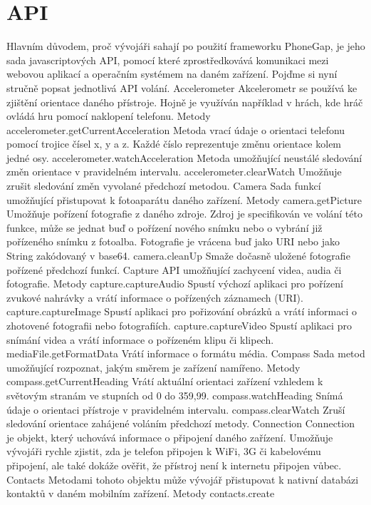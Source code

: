 \section{API}
Hlavním důvodem, proč vývojáři sahají po použití frameworku PhoneGap, je jeho sada javascriptových API, pomocí které zprostředkovává komunikaci mezi webovou aplikací a operačním systémem na daném zařízení. Pojďme si nyní stručně popsat jednotlivá API volání.
Accelerometer
Akcelerometr se používá ke zjištění orientace daného přístroje. Hojně je využíván například v hrách, kde hráč ovládá hru pomocí naklopení telefonu.
Metody
accelerometer.getCurrentAcceleration
Metoda vrací údaje o orientaci telefonu pomocí trojice čísel x, y a z. Každé číslo reprezentuje změnu orientace kolem jedné osy.
accelerometer.watchAcceleration
Metoda umožňující neustálé sledování změn orientace v pravidelném intervalu.
accelerometer.clearWatch
Umožňuje zrušit sledování změn vyvolané předchozí metodou.
Camera
Sada funkcí umožňující přistupovat k fotoaparátu daného zařízení.
Metody
camera.getPicture
Umožňuje pořízení fotografie z daného zdroje. Zdroj je specifikován ve volání této funkce, může se jednat buď o pořízení nového snímku nebo o vybrání již pořízeného snímku z fotoalba. Fotografie je vrácena buď jako URI nebo jako String zakódovaný v base64.
camera.cleanUp
Smaže dočasně uložené fotografie pořízené předchozí funkcí.
Capture
API umožňující zachycení videa, audia či fotografie.
Metody
capture.captureAudio
Spustí výchozí aplikaci pro pořízení zvukové nahrávky a vrátí informace o pořízených záznamech (URI).
capture.captureImage
Spustí aplikaci pro pořizování obrázků a vrátí informaci o zhotovené fotografii nebo fotografiích.
capture.captureVideo
Spustí aplikaci pro snímání videa a vrátí informace o pořízeném klipu či klipech.
mediaFile.getFormatData
Vrátí informace o formátu média.
Compass
Sada metod umožňující rozpoznat, jakým směrem je zařízení namířeno.
Metody
compass.getCurrentHeading
Vrátí aktuální orientaci zařízení vzhledem k světovým stranám ve stupních od 0 do 359,99.
compass.watchHeading
Snímá údaje o orientaci přístroje v pravidelném intervalu.
compass.clearWatch
Zruší sledování orientace zahájené voláním předchozí metody.
Connection
Connection je objekt, který uchovává informace o připojení daného zařízení. Umožňuje vývojáři rychle zjistit, zda je telefon připojen k WiFi, 3G či kabelovému připojení, ale také dokáže ověřit, že přístroj není k internetu připojen vůbec.
Contacts
Metodami tohoto objektu může vývojář přistupovat k nativní databázi kontaktů v daném mobilním zařízení.
Metody
contacts.create
